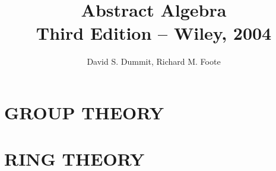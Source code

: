 \documentclass[english, 11pt, a4paper]{book}
\begin{document}
\DeclareRobustCommand{\rchi}{{\mathpalette\irchi\relax}}
\newcommand{\irchi}[2]{\raisebox{\depth}{$#1\chi$}} %

\makeatletter
\newcommand{\mybox}{%
    \collectbox{%
        \setlength{\fboxsep}{1pt}%
        \fbox{\BOXCONTENT}%
    }%
}
\makeatother

\author{David S. Dummit, Richard M. Foote}
\title{Abstract Algebra\\
\small{Third Edition -- Wiley, 2004}}
\maketitle

\frontmatter%

%

%	
\setcounter{tocdepth}{1}	%
\tableofcontents

\mainmatter%



\part{GROUP THEORY}


\part{RING THEORY}
\end{document}
